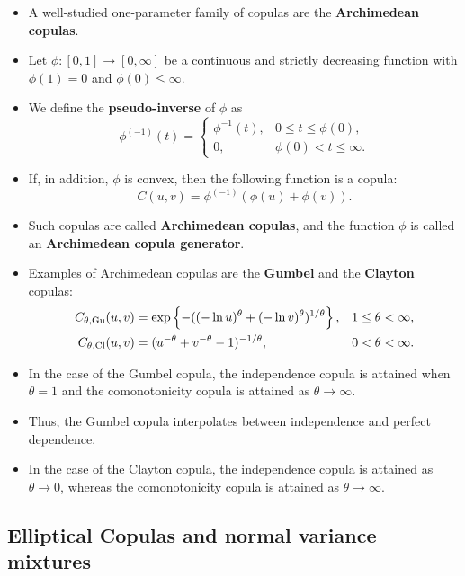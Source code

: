 \begin{itemize}
\item A well-studied one-parameter family of copulas are the {\bf 
    Archimedean copulas}. 
\item Let $\phi:[0,1]\rightarrow[0,\infty]$ be a
  continuous and strictly decreasing function with $\phi(1)=0$ and
  $\phi(0)\leq\infty$.
\item  We define the {\bf pseudo-inverse} of $\phi$ as 
  \begin{equation*}
    \phi^{(-1)}(t)=
    \begin{cases}
      \phi^{-1}(t), &0\leq t\leq \phi(0),\\
      0, &\phi(0)<t\leq\infty.
    \end{cases}
  \end{equation*}
\item If, in addition, $\phi$ is convex, then the following function
  is a copula: 
  \begin{equation*}
    C(u,v)=\phi^{(-1)}(\phi(u)+\phi(v)).
  \end{equation*}
  \vspace*{-\baselineskip}
\item Such copulas are called {\bf Archimedean copulas}, and the
  function $\phi$ is called an {\bf Archimedean copula generator}. 
\item Examples of Archimedean copulas are the {\bf Gumbel} and the
  {\bf Clayton} copulas:
  \begin{align*}
    C_{\theta,{\rm Gu}}(u,v) &= \exp\left\{-((-\ln u)^\theta + (-\ln
                               v)^\theta)^{1/\theta}\right\},& 1\leq \theta<\infty,\\
    C_{\theta,{\rm Cl}}(u,v)&= (u^{-\theta} + v^{-\theta}
                              -1)^{-1/\theta}, & 0<\theta<\infty. 
  \end{align*}
\item In the case of the Gumbel copula, the independence copula is 
  attained when $\theta=1$ and the comonotonicity copula is attained
  as $\theta\rightarrow\infty$. 
\item Thus, the Gumbel copula interpolates between independence and
  perfect dependence.  
\item In the case of the Clayton copula, the independence copula is
  attained as $\theta\rightarrow 0$, whereas the comonotonicity
  copula is attained as $\theta\rightarrow\infty$. 
\end{itemize}

\subsection{Elliptical Copulas and normal variance mixtures}
\label{subsec:elliptical-copulae}


